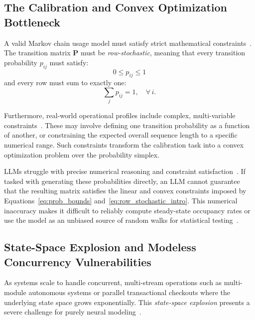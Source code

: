 \subsection{The Calibration and Convex Optimization Bottleneck}
\label{subsec:calibration}

A valid Markov chain usage model must satisfy strict mathematical constraints~\cite{whittaker1993markov, nap_statistics}. The transition matrix $\mathbf{P}$ must be \emph{row-stochastic}, meaning that every transition probability $p_{ij}$ must satisfy:
\begin{equation}
    0 \leq p_{ij} \leq 1
    \label{eq:prob_bounds}
\end{equation}
and every row must sum to exactly one:
\begin{equation}
    \sum_{j} p_{ij} = 1, \quad \forall\, i.
    \label{eq:row_stochastic_intro}
\end{equation}

Furthermore, real-world operational profiles include complex, multi-variable constraints~\cite{boehr_constraints}. These may involve defining one transition probability as a function of another, or constraining the expected overall sequence length to a specific numerical range. Such constraints transform the calibration task into a convex optimization problem over the probability simplex.

LLMs struggle with precise numerical reasoning and constraint satisfaction~\cite{llm_numerical_reasoning}. If tasked with generating these probabilities directly, an LLM cannot guarantee that the resulting matrix satisfies the linear and convex constraints imposed by Equations~\eqref{eq:prob_bounds} and~\eqref{eq:row_stochastic_intro}. This numerical inaccuracy makes it difficult to reliably compute steady-state occupancy rates or use the model as an unbiased source of random walks for statistical testing~\cite{markov_reliability}.



\subsection{State-Space Explosion and Modeless Concurrency Vulnerabilities}
\label{subsec:state_explosion}

As systems scale to handle concurrent, multi-stream operations such as multi-module autonomous systems or parallel transactional checkouts where the underlying state space grows exponentially. This \emph{state-space explosion} presents a severe challenge for purely neural modeling~\cite{chatfume, protocol_gpt}.

